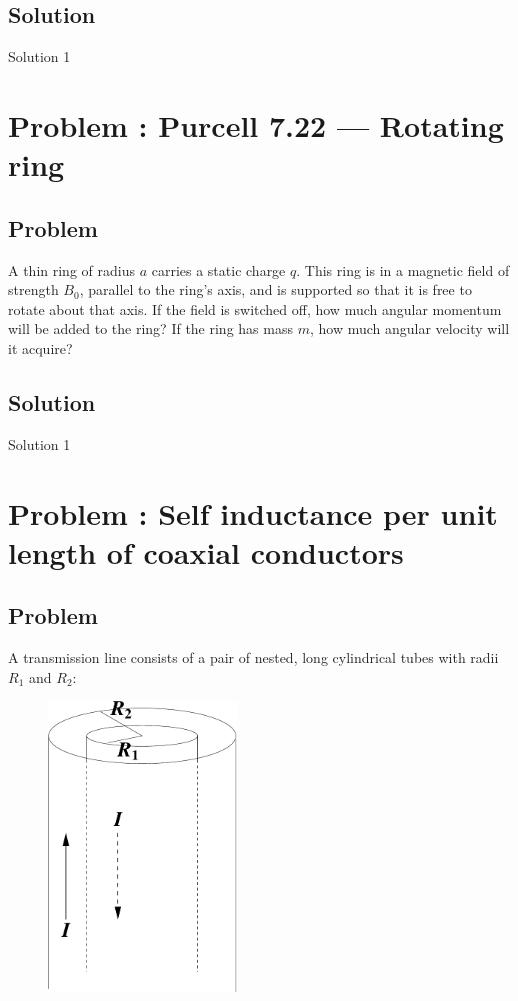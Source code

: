 \documentclass[solutions]{esg8022pset}
\begin{document}
\subsection{Solution}
  Solution 1
\section{Problem \thesection: Purcell 7.22 --- Rotating ring}
\subsection{Problem}
A thin ring of radius $a$ carries a static charge $q$. This ring is in a magnetic field of strength $B_0$, parallel to the ring's axis, and is supported so that it is free to rotate about that axis. If the field is switched off, how much angular momentum will be added to the ring? If the ring has mass $m$, how much angular velocity will it acquire?
\subsection{Solution}
  Solution 1
\section{Problem \thesection: Self inductance per unit length of coaxial conductors }
\subsection{Problem}
A transmission line consists of a pair of nested, long cylindrical
tubes with radii $R_1$ and $R_2$:

  \begin{figure}[H]
    \centering
    \includegraphics[width = 5cm]{coaxind}
    \label{fig:coax}
  \end{figure}
\end{document}
